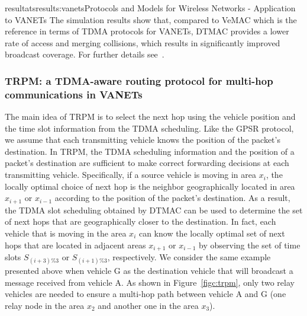 \documentclass{ra2016}
\begin{document}
\begin{module}{resultats}{results:vanets}{Protocols and Models for Wireless Networks - Application to VANETs}
The simulation results show that, compared to VeMAC which is the reference in terms of TDMA protocols for VANETs, DTMAC provides a lower rate of access and merging collisions, which results in significantly improved broadcast coverage. For further details see~\cite{hadded:hal-01379216}. 



\subsubsection{TRPM:  a TDMA-aware routing protocol for multi-hop communications in VANETs}
\begin{participants}
\end{participants}
The main idea of TRPM is to select the next hop using the vehicle position and the time 
slot information from the TDMA scheduling.  Like the GPSR protocol, we assume that each transmitting vehicle 
knows the position of the packet's destination. In TRPM, the TDMA scheduling information and the position of a packet's destination 
are sufficient to make correct forwarding decisions at each transmitting vehicle. Specifically, if a  source vehicle is moving in 
area $x_i$, the locally optimal choice of next hop is the neighbor geographically located in area $x_{i+1}$ or $x_{i-1}$ according 
to the position of the packet's destination. As a result, the TDMA slot scheduling obtained by DTMAC  can be used to determine the 
set of next hops that are geographically closer to the destination. In fact, each vehicle that is moving in the area $x_i$ can 
know the locally optimal set of next hops that are located in adjacent areas $x_{i+1}$ or $x_{i-1}$ by observing the set of time 
slots $S_{(i+3)\%3}$ or $S_{(i+1)\%3}$, respectively. We consider the same example presented above when vehicle G as the destination 
vehicle that will broadcast a message received from vehicle A. As shown in Figure~\ref{figc:trpm}, only two relay vehicles are needed to ensure a 
multi-hop path between vehicle A and G (one relay node in the area $x_2$ and another one in the area $x_3$). 



\end{module}
\end{document}
